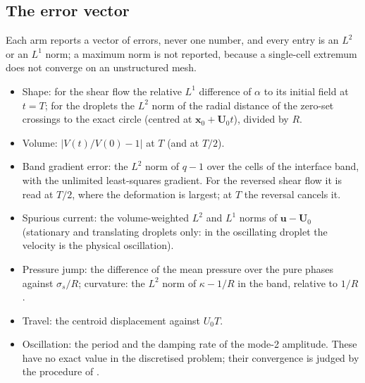 \documentclass[preprint,3p,11pt]{elsarticle}
\newcommand{\bu}{\mathbf{u}}
\newcommand{\bx}{\mathbf{x}}
\begin{document}
\subsection{The error vector}
\label{sec:gate-metrics}
Each arm reports a vector of errors, never one number, and every entry is an $L^2$ or an
$L^1$ norm; a maximum norm is not reported, because a single-cell extremum does not
converge on an unstructured mesh.
\begin{itemize}
  \item Shape: for the shear flow the relative $L^1$ difference of $\alpha$ to its
  initial field at $t=T$; for the droplets the $L^2$ norm of the radial distance of the
  zero-set crossings to the exact circle (centred at $\bx_0+\mathbf U_0t$), divided by $R$.
  \item Volume: $|V(t)/V(0)-1|$ at $T$ (and at $T/2$).
  \item Band gradient error: the $L^2$ norm of $q-1$ over the cells of the interface
  band, with the unlimited least-squares gradient. For the reversed shear flow it is read
  at $T/2$, where the deformation is largest; at $T$ the reversal cancels it.
  \item Spurious current: the volume-weighted $L^2$ and $L^1$ norms of $\bu-\mathbf U_0$
  (stationary and translating droplets only: in the oscillating droplet the velocity is
  the physical oscillation).
  \item Pressure jump: the difference of the mean pressure over the pure phases against
  $\sigma_s/R$; curvature: the $L^2$ norm of $\kappa-1/R$ in the band, relative to $1/R$.
  \item Travel: the centroid displacement against $U_0T$.
  \item Oscillation: the period and the damping rate of the mode-2 amplitude. These have
  no exact value in the discretised problem; their convergence is judged by the
  procedure of \cite{Celik2008}.
\end{itemize}
\end{document}
